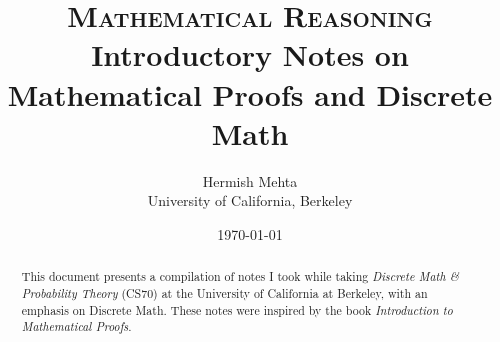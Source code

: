 \documentclass{report}
\begin{document}
\title{\textsc{Mathematical Reasoning} \\
	\large Introductory Notes on Mathematical Proofs and Discrete Math}
\author{Hermish Mehta \\ University of California, Berkeley}
\date{\today}
\maketitle

\begin{abstract}
	This document presents a compilation of notes I took while taking \emph{Discrete Math \& Probability Theory} (CS70) at the University of California at Berkeley, with an emphasis on  Discrete Math. These notes were inspired by the book \textit{Introduction to Mathematical Proofs}.
\end{abstract}

\tableofcontents




%
%
%
\end{document}
